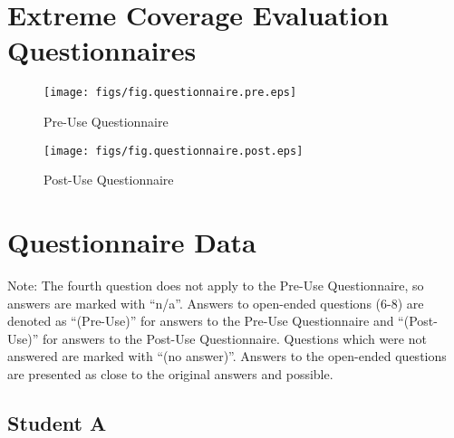 
\appendix
\chapter {Extreme Coverage Evaluation Questionnaires}


\begin{figure}[htbp]
  \centering
  \texttt{[image: figs/fig.questionnaire.pre.eps]}
  \caption{Pre-Use Questionnaire}
  \label{fig:questionnaire.pre}
\end{figure}

\begin{figure}[htbp]
  \centering
  \texttt{[image: figs/fig.questionnaire.post.eps]}
  \caption{Post-Use Questionnaire}
  \label{fig:questionnaire.post}
\end{figure}

\chapter {Questionnaire Data}

Note: The fourth question does not apply to the Pre-Use Questionnaire, so
answers are marked with ``n/a''.  Answers to open-ended questions (6-8) are
denoted as ``(Pre-Use)'' for answers to the Pre-Use Questionnaire and
``(Post-Use)'' for answers to the Post-Use Questionnaire.  Questions which
were not answered are marked with ``(no answer)''.  Answers to the
open-ended questions are presented as close to the original answers and
possible.

\pagebreak

\section{Student A}

